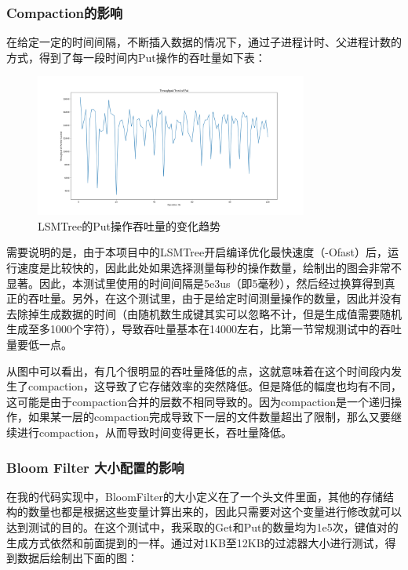 \documentclass{article}
\begin{document}
\subsubsection{Compaction的影响}

在给定一定的时间间隔，不断插入数据的情况下，通过子进程计时、父进程计数的方式，得到了每一段时间内Put操作的吞吐量如下表：

\begin{figure}[h]
    \centering
    \includegraphics[width=0.8\textwidth]{images/compaction.png}
    \caption{LSMTree的Put操作吞吐量的变化趋势}
    \label{compaction}
\end{figure}

需要说明的是，由于本项目中的LSMTree开启编译优化最快速度（-Ofast）后，运行速度是比较快的，因此此处如果选择测量每秒的操作数量，绘制出的图会非常不显著。因此，本测试里使用的时间间隔是5e3us（即5毫秒），然后经过换算得到真正的吞吐量。另外，在这个测试里，由于是给定时间测量操作的数量，因此并没有去除掉生成数据的时间（由随机数生成键其实可以忽略不计，但是生成值需要随机生成至多1000个字符），导致吞吐量基本在14000左右，比第一节常规测试中的吞吐量要低一点。

从图中可以看出，有几个很明显的吞吐量降低的点，这就意味着在这个时间段内发生了compaction，这导致了它存储效率的突然降低。但是降低的幅度也均有不同，这可能是由于compaction合并的层数不相同导致的。因为compaction是一个递归操作，如果某一层的compaction完成导致下一层的文件数量超出了限制，那么又要继续进行compaction，从而导致时间变得更长，吞吐量降低。

\subsubsection{Bloom Filter 大小配置的影响}

在我的代码实现中，BloomFilter的大小定义在了一个头文件里面，其他的存储结构的数量也都是根据这些变量计算出来的，因此只需要对这个变量进行修改就可以达到测试的目的。在这个测试中，我采取的Get和Put的数量均为1e5次，键值对的生成方式依然和前面提到的一样。通过对1KB至12KB的过滤器大小进行测试，得到数据后绘制出下面的图：
\end{document}
